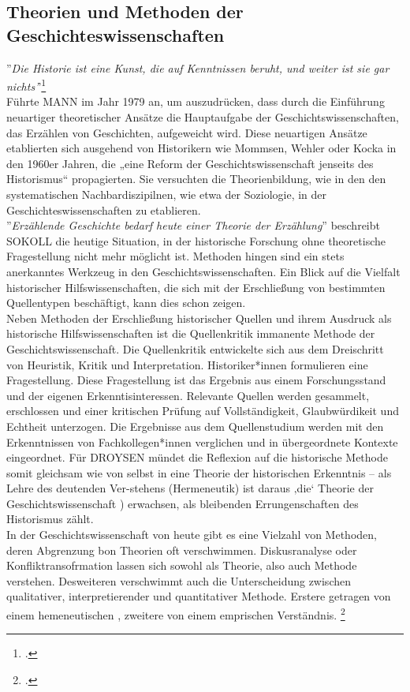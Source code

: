 \documentclass[12pt,a4paper]{article}
\begin{document}
\subsection{Theorien und Methoden der Geschichteswissenschaften}

''\textit{Die Historie ist eine Kunst, die auf Kenntnissen beruht, und weiter ist sie gar nichts'}'\footcite[TODO Seitenanzahl und .In][S.40--56]{mann1979pladoyer}
\\
Führte MANN im Jahr 1979 an, um auszudrücken, dass durch die Einführung neuartiger theoretischer Ansätze die Hauptaufgabe der Geschichtswissenschaften, das Erzählen von Geschichten, aufgeweicht wird. Diese neuartigen Ansätze etablierten sich ausgehend von Historikern wie Mommsen, Wehler oder Kocka in den 1960er Jahren, die „eine Reform der Geschichtswissenschaft jenseits des Historismus“ propagierten. Sie versuchten die Theorienbildung, wie in den den systematischen Nachbardiszipilnen, wie etwa der Soziologie, in der Geschichteswissenschaften zu etablieren.
\\
''\textit{Erzählende Geschichte bedarf heute einer Theorie der Erzählung}'' beschreibt SOKOLL die heutige Situation, in der historische Forschung ohne theoretische Fragestellung nicht mehr möglicht ist. Methoden hingen sind ein stets anerkanntes Werkzeug in den Geschichtswissenschaften. Ein Blick auf die Vielfalt historischer Hilfswissenschaften, die sich mit der Erschließung von bestimmten Quellentypen beschäftigt, kann dies schon zeigen. 
\\
Neben Methoden der Erschließung historischer Quellen und ihrem Ausdruck als historische Hilfswissenschaften ist die Quellenkritik immanente Methode der Geschichtswissenschaft. Die Quellenkritik entwickelte sich aus dem Dreischritt von Heuristik, Kritik und Interpretation. Historiker*innen formulieren eine Fragestellung. Diese Fragestellung ist das Ergebnis aus einem Forschungsstand und der eigenen Erkenntisinteressen. Relevante Quellen werden gesammelt, erschlossen und einer kritischen Prüfung auf Vollständigkeit, Glaubwürdikeit und Echtheit unterzogen. Die Ergebnisse aus dem Quellenstudium werden mit den Erkenntnissen von Fachkollegen*innen verglichen und in übergeordnete Kontexte eingeordnet.
Für DROYSEN mündet die Reflexion auf die historische Methode somit gleichsam wie von selbst in eine Theorie der historischen Erkenntnis – als Lehre des deutenden Ver-stehens (Hermeneutik) ist daraus ‚die‘ Theorie der Geschichtswissenschaft ) erwachsen, als bleibenden Errungenschaften des Historismus zählt.
\\
In der Geschichtswissenschaft von heute gibt es eine Vielzahl von Methoden, deren Abgrenzung bon Theorien oft verschwimmen. Diskusranalyse oder Konfliktransofrmation lassen sich sowohl als Theorie, also auch Methode verstehen. Desweiteren verschwimmt auch die Unterscheidung zwischen qualitativer, interpretierender und quantitativer Methode. Erstere getragen von einem hemeneutischen , zweitere von einem emprischen Verständnis. 
\footcite[Vgl, TODO][S. 1--5]{sokollgrundlagen}
\end{document}
